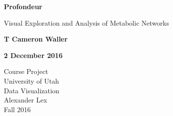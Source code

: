 

\begin{titlepage}
\begin{center}

\vspace*{2cm}
\Huge
\textbf{Profondeur}

\vspace{0.5cm}
\LARGE
Visual Exploration and Analysis of Metabolic Networks

\vspace{1.5cm}
\LARGE
\textbf{T Cameron Waller}

\vspace{1.5cm}
\Large
\textbf{2 December 2016}


\vfill
\Large
Course Project\\
University of Utah\\
Data Visualization\\
Alexander Lex\\
Fall 2016

\end{center}
\end{titlepage}